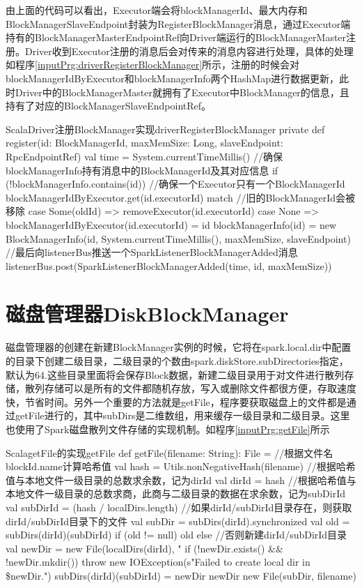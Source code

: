 由上面的代码可以看出，Executor端会将blockManagerId、最大内存和BlockManagerSlaveEndpoint封装为RegisterBlockManager消息，通过Executor端持有的BlockManagerMasterEndpointRef向Driver端运行的BlockManagerMaster注册。Driver收到Executor注册的消息后会对传来的消息内容进行处理，具体的处理如程序\ref{inputPrg:driverRegisterBlockManager}所示，注册的时候会对blockManagerIdByExecutor和blockManagerInfo两个HashMap进行数据更新，此时Driver中的BlockManagerMaster就拥有了Executor中BlockManager的信息，且持有了对应的BlockManagerSlaveEndpointRef。
\begin{codeInput}{Scala}{Driver注册BlockManager实现}{driverRegisterBlockManager}
private def register(id: BlockManagerId, maxMemSize: Long, slaveEndpoint: RpcEndpointRef) {
  val time = System.currentTimeMillis()
  //确保blockManagerInfo持有消息中的BlockManagerId及其对应信息
  if (!blockManagerInfo.contains(id)) {
    //确保一个Executor只有一个BlockManagerId
    blockManagerIdByExecutor.get(id.executorId) match {
    //旧的BlockManagerId会被移除
      case Some(oldId) =>
        removeExecutor(id.executorId)
      case None =>
    }
  blockManagerIdByExecutor(id.executorId) = id	
  blockManagerInfo(id) = new BlockManagerInfo(id, System.currentTimeMillis(), maxMemSize, slaveEndpoint)
  }
  //最后向listenerBus推送一个SparkListenerBlockManagerAdded消息
  listenerBus.post(SparkListenerBlockManagerAdded(time, id, maxMemSize))
}
\end{codeInput}
\section{磁盘管理器DiskBlockManager}
磁盘管理器的创建在新建BlockManager实例的时候，它将在spark.local.dir中配置的目录下创建二级目录，二级目录的个数由spark.diskStore.subDirectories指定，默认为64.这些目录里面将会保存Block数据，新建二级目录用于对文件进行散列存储，散列存储可以是所有的文件都随机存放，写入或删除文件都很方便，存取速度快，节省时间。另外一个重要的方法就是getFile，程序要获取磁盘上的文件都是通过getFile进行的，其中subDirs是二维数组，用来缓存一级目录和二级目录。这里也使用了Spark磁盘散列文件存储的实现机制。如程序\ref{inputPrg:getFile}所示
\begin{codeInput}{Scala}{getFile的实现}{getFile}
def getFile(filename: String): File = {
  //根据文件名blockId.name计算哈希值
  val hash = Utils.nonNegativeHash(filename)
  //根据哈希值与本地文件一级目录的总数求余数，记为dirId
  val dirId = hash %
  //根据哈希值与本地文件一级目录的总数求商，此商与二级目录的数据在求余数，记为subDirId
  val subDirId = (hash / localDirs.length) %
  //如果dirId/subDirId目录存在，则获取dirId/subDirId目录下的文件
  val subDir = subDirs(dirId).synchronized {
    val old = subDirs(dirId)(subDirId)
    if (old != null) {
      old
    } else {
      //否则新建dirId/subDirId目录
      val newDir = new File(localDirs(dirId), "%
      if (!newDir.exists() && !newDir.mkdir()) {
        throw new IOException(s"Failed to create local dir in \$newDir.")
      }
      subDirs(dirId)(subDirId) = newDir
      newDir
    }
  }	
  new File(subDir, filename)
}
\end{codeInput}
